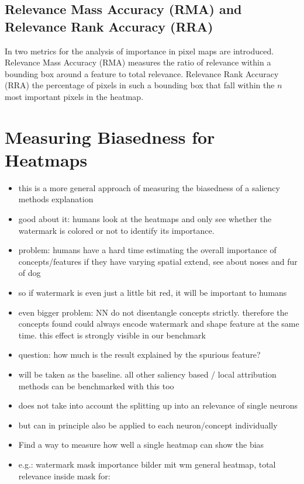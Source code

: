 \subsection{Relevance Mass Accuracy (RMA) and Relevance Rank Accuracy (RRA)}
In \cite{Arras2022} two metrics for the analysis of importance in pixel maps are introduced. Relevance Mass Accuracy (RMA) measures the ratio of relevance within a bounding box around a feature to total relevance. Relevance Rank Accuracy (RRA) the percentage of pixels in such a bounding box that fall within the $n$ most important pixels in the heatmap.

\section{Measuring Biasedness for Heatmaps}
\begin{itemize}
    \item this is a more general approach of measuring the biasedness of a saliency methods explanation
    \item good about it: humans look at the heatmaps and only see whether the watermark is colored or not to identify its importance.
    \item problem: humans have a hard time estimating the overall importance of concepts/features if they have varying spatial extend, see \cite{Achtibat2022} about noses and fur of dog
    \item so if watermark is even just a little bit red, it will be important to humans
    \item even bigger problem: NN do not disentangle concepts strictly. therefore the concepts found could always encode watermark and shape feature at the same time. this effect is strongly visible in our benchmark
    \item question: how much is the result explained by the spurious feature?
    \item will be taken as the baseline. all other saliency based / local attribution methods can be benchmarked with this too
    \item does not take into account the splitting up into an relevance of single neurons
    \item but can in principle also be applied to each neuron/concept individually
    \item Find a way to measure how well a single heatmap can show the bias
    \item e.g.: watermark mask importance bilder mit wm general heatmap, total relevance inside mask for:

\end{itemize}
